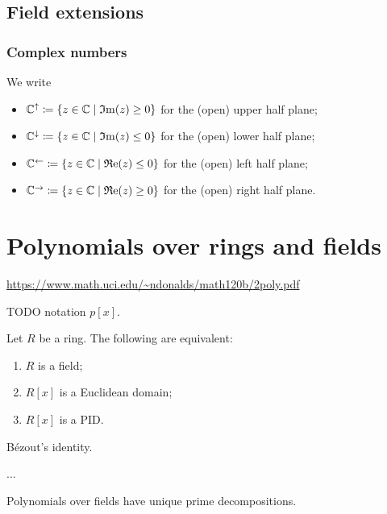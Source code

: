 \subsection{Field extensions}
\subsubsection{Complex numbers}
\begin{definition}
We write
\begin{itemize}
\item $\C^{\uparrow} \defeq \setbuilder{z\in\C}{\Im(z) \geq 0}$ for the (open) upper half plane;
\item $\C^{\downarrow} \defeq \setbuilder{z\in\C}{\Im(z) \leq 0}$ for the (open) lower half plane;
\item $\C^{\leftarrow} \defeq \setbuilder{z\in\C}{\Re(z) \leq 0}$ for the (open) left half plane;
\item $\C^{\rightarrow}  \defeq \setbuilder{z\in\C}{\Re(z) \geq 0}$ for the (open) right half plane.
\end{itemize}
\end{definition}

\section{Polynomials over rings and fields}
\url{https://www.math.uci.edu/~ndonalds/math120b/2poly.pdf}

TODO notation $p[x]$.

\begin{proposition}
Let $R$ be a ring. The following are equivalent:
\begin{enumerate}
\item $R$ is a field;
\item $R[x]$ is a Euclidean domain;
\item $R[x]$ is a PID.
\end{enumerate}
\end{proposition}
\begin{corollary}
Bézout's identity.

...
\end{corollary}


\begin{proposition}
Polynomials over fields have unique prime decompositions.
\end{proposition}


